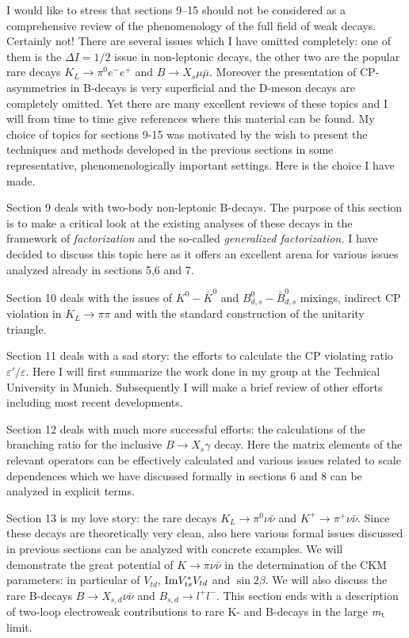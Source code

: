 \documentclass[12pt]{article}
\newcommand{\IM}{{\rm Im}}
\def\epe{\varepsilon'/\varepsilon}
\newcommand{\mt}{m_{\rm t}}
\newcommand{\Bsg}{$B \to X_s \gamma$ }
\begin{document}
I would like to stress that sections 9--15 should not be considered as a
comprehensive review of the phenomenology of the full field of weak decays.
Certainly not! There are several issues which I have omitted completely: one
of them is the $\Delta I=1/2$ issue in non-leptonic decays, 
the other two are the
popular rare decays $K_L\to\pi^0 e^-e^+$ and $B\to X_s\mu\bar\mu$. 
Moreover the presentation of CP-asymmetries in
B-decays is very superficial and the D-meson decays are completely omitted.
Yet there are many excellent reviews of these
topics and I will from time to time give references where this material can
be found. My choice of topics for sections 9-15 was motivated by the wish to
present the techniques and methods developed in the previous sections in some
representative, phenomenologically important settings. 
Here is the choice I have made.

Section 9 deals with two-body non-leptonic B-decays. 
The purpose of this section is to make a
critical look at the existing analyses of these decays in the framework of
{\it factorization} and the so-called {\it generalized factorization.}
 I have decided to
discuss this topic here as it offers an excellent arena for various issues
analyzed already in sections 5,6 and 7.

Section 10 deals with the issues of $K^0-\bar K^0$ and 
$B^0_{d,s}-\bar B^0_{d,s}$ mixings, indirect CP violation in
$K_L\to\pi\pi$ and with the standard construction of the unitarity triangle.

Section 11 deals with a sad story: the efforts to calculate the CP violating
ratio $\epe$. Here I will first summarize the work done in my group at the
Technical University in  Munich. Subsequently I will make a brief review of
other efforts including most recent developments.

Section 12 deals with much more successful efforts: the calculations of the
branching ratio for the inclusive \Bsg decay. Here the matrix elements of the
relevant operators can be effectively calculated and various issues related
to scale dependences which we have discussed formally in sections 6 and 8 can
be analyzed in explicit terms.

Section 13 is my love story: the rare decays $K_L\to\pi^0\nu\bar\nu$
and $K^+\to\pi^+\nu\bar\nu$. Since these decays are
theoretically very clean, also here various formal issues discussed in
previous sections can be analyzed with concrete examples. We will
demonstrate the great potential of $K\to\pi\nu\bar\nu$ 
in the determination of the CKM
parameters: in particular of $V_{td}$, $\IM V^{*}_{ts}V_{td}$ and
$\sin 2\beta$. We will also discuss the rare B-decays 
$B\to X_{s,d}\nu\bar\nu$ and $B_{s,d}\to l^+l^-$.
This section ends with a description of two-loop electroweak contributions to
rare K- and B-decays in the large $\mt$ limit.
\end{document}
